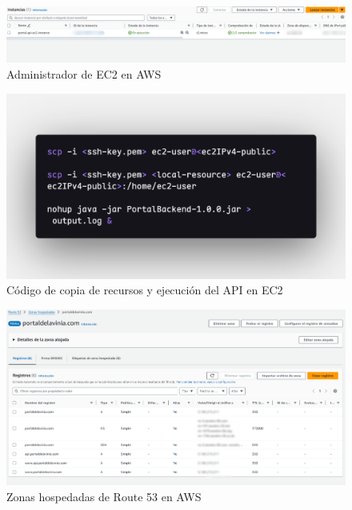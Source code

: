 \begin{figure}[H]
    \centering
    \includegraphics[width=1\textwidth]{resources/images/aws-ec2}
    \caption{Administrador de EC2 en AWS}
    \label{fig:ec2}
\end{figure}

\begin{figure}[H]
    \centering
    \includegraphics[width=1\textwidth]{resources/images/aws-ec2-code}
    \caption{Código de copia de recursos y ejecución del API en EC2}
    \label{fig:ec2-code}
\end{figure}

\begin{figure}[H]
    \centering
    \includegraphics[width=1\textwidth]{resources/images/aws-route53}
    \caption{Zonas hospedadas de Route 53 en AWS}
    \label{fig:route53}
\end{figure}

